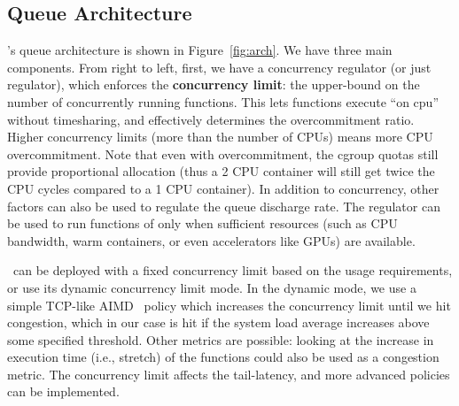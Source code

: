 \subsection{Queue Architecture}
\label{sec:q:arch}

\sysname's queue architecture is shown in Figure~\ref{fig:arch}.
We have three main components.
%
From right to left, first, we have a concurrency regulator (or just regulator), which enforces the \textbf{concurrency limit}: the  upper-bound on the number of concurrently running functions. 
%
This lets functions execute ``on cpu'' without timesharing, and effectively determines the overcommitment ratio.
Higher concurrency limits (more than the number of CPUs) means  more CPU overcommitment.
Note that even with overcommitment, the cgroup quotas still provide proportional allocation (thus a 2 CPU container will still get twice the CPU cycles compared to a 1 CPU container). 
%
In addition to concurrency, other factors can also be used to regulate the queue discharge rate. 
The regulator can be used to run functions of only when sufficient resources (such as CPU bandwidth, warm containers, or even accelerators like GPUs) are available. 


\sysname~can be deployed with a fixed concurrency limit based on the usage requirements, or use its dynamic concurrency limit mode. 
In the dynamic mode, we use a simple TCP-like AIMD~\cite{yang2000general} policy which increases the concurrency limit until we hit congestion, which in our case is hit if the system load average increases above some specified threshold. 
Other metrics are possible: looking at the increase in execution time (i.e., stretch) of the functions could also be used as a congestion metric.
The concurrency limit affects the tail-latency, and more advanced policies can be implemented. 


\begin{comment}
Having the container map also allows us to implement \textbf{concurrent cold start mitigation}.
If the function at the head of the queue has no warm containers available, and one of its instantiations is running, then we put the function back in the queue.
As a function's warm start is typically orders of magnitude shorter than cold starts, it is better for it to wait for warm container than to cold start one.
We implement this by asking the container pool for a warm container, and if it fails to give us one we can re-queue the invocation for the future.
Optionally, we can allow for a cold start to increase the number of warm containers for a function, naturally scaling if there is an increase in frequency.
\end{comment}

